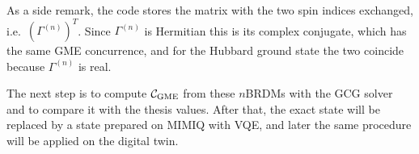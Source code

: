 \documentclass[11pt,a4paper]{article}
\begin{document}
As a side remark, the code stores the matrix with the two spin indices
exchanged, i.e.\ $(\Gamma^{(n)})^T$. Since $\Gamma^{(n)}$ is Hermitian this is
its complex conjugate, which has the same GME concurrence, and for the Hubbard
ground state the two coincide because $\Gamma^{(n)}$ is real.

The next step is to compute $\mathcal{C}_{\rm GME}$ from these $n$BRDMs with
the GCG solver and to compare it with the thesis values. After that, the exact
state will be replaced by a state prepared on MIMIQ with VQE, and later the same
procedure will be applied on the digital twin.
\end{document}
